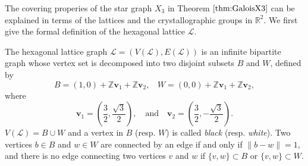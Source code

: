 \documentclass[lualatex,12pt]{article}
\begin{document}
The covering properies of the star graph $X_3$ in
Theorem $\ref{thm:GaloisX3}$ can be explained in terms of 
the lattices and the crystallographic groups in ${\mathbb R}^2$.
We first give the formal definition
of the hexagonal lattice ${\mathcal L}$.

The hexagonal lattice graph ${\mathcal L}=(V({\mathcal L}), E({\mathcal L}))$
is an infinite bipartite graph whose vertex set is decomposed into
two disjoint subsets $B$ and $W$, defined by
\begin{equation}
 \label{eq:BW}
 B = (1,0) + {\mathbb Z}{\mathbf v}_1 + {\mathbb Z}{\mathbf v}_2,~~~~
 W = (0,0) + {\mathbb Z}{\mathbf v}_1 + {\mathbb Z}{\mathbf v}_2,
\end{equation}
where 
\begin{equation}
 \label{eq:defbase}
{\mathbf v}_1 = \left(\frac{3}{2}, \frac{\sqrt{3}}{2}\right), 
\mbox{~~ and ~~} {\mathbf v}_2 = \left(\frac{3}{2}, -\frac{\sqrt{3}}{2}\right).
\end{equation}
$V({\mathcal L})=B\cup W$ and a vertex in $B$ (resp. $W$) is called {\em black} (resp. {\em white}).
Two vertices $b\in B$ and $w\in W$ are connected by an edge
if and only if 
$\|b-w\|=1$,
and there is no edge connecting two vertices $v$ and $w$ if
$\{v,w\}\subset B$ or $\{v,w\}\subset W$.
\end{document}
